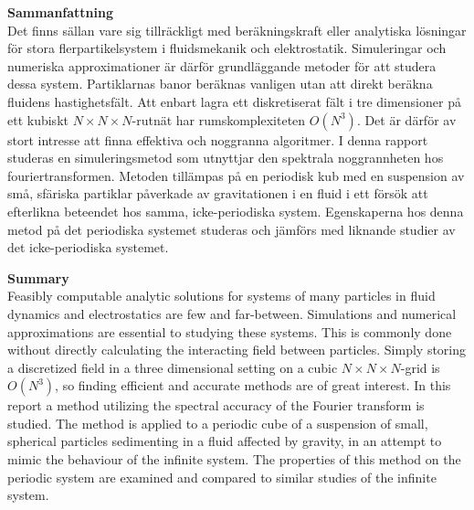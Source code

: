 \documentclass[a4paper,
twoside=false,abstract=false,numbers=noenddot,
titlepage=false,headings=small,parskip=half,version=last]{scrartcl}
\begin{document}
{\Large \bf Sammanfattning}\\
Det finns sällan vare sig tillräckligt med beräkningskraft eller analytiska lösningar för stora flerpartikelsystem i fluidsmekanik och elektrostatik.
Simuleringar och numeriska approximationer är därför grundläggande metoder för att studera dessa system.
Partiklarnas banor beräknas vanligen utan att direkt beräkna fluidens hastighetsfält.
Att enbart lagra ett diskretiserat fält i tre dimensioner på ett kubiskt $N\times N\times N$-rutnät har rumskomplexiteten $O(N^3)$.
Det är därför av stort intresse att finna effektiva och noggranna algoritmer.
I denna rapport studeras en simuleringsmetod som utnyttjar den spektrala noggrannheten hos fouriertransformen.
Metoden tillämpas på en periodisk kub med en suspension av små, sfäriska partiklar påverkade av gravitationen i en fluid i ett försök att efterlikna beteendet hos samma, icke-periodiska system.
Egenskaperna hos denna metod på det periodiska systemet studeras och jämförs med liknande studier av det icke-periodiska systemet.

\vspace{20mm}
{\Large \bf Summary}\\
Feasibly computable analytic solutions for systems of many particles in fluid dynamics and electrostatics are few and far-between.
Simulations and numerical approximations are essential to studying these systems.
This is commonly done without directly calculating the interacting field between particles.
Simply storing a discretized field in a three dimensional setting on a cubic $N\times N\times N$-grid is $O(N^3)$, so finding efficient and accurate methods are of great interest.
In this report a method utilizing the spectral accuracy of the Fourier transform is studied.
The method is applied to a periodic cube of a suspension of small, spherical particles sedimenting in a fluid affected by gravity, in an attempt to mimic the behaviour of the infinite system.
The properties of this method on the periodic system are examined and compared to similar studies of the infinite system.
\end{document}
